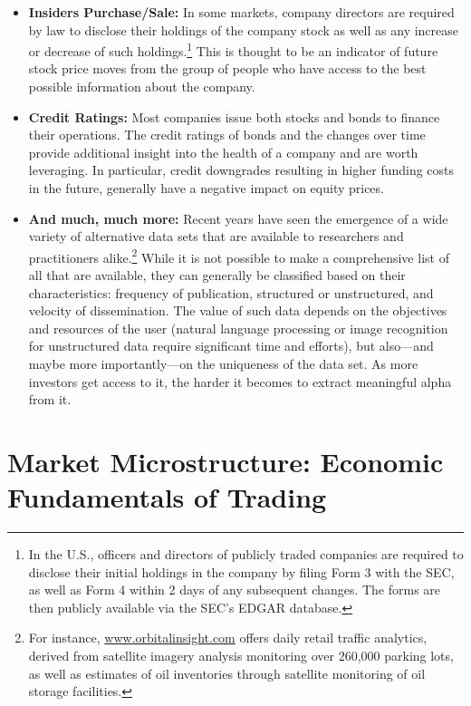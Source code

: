 \begin{itemize}
\item \textbf{Insiders Purchase/Sale:} In some markets, company directors are required by law to disclose their holdings of the company stock as well as any increase or decrease of such holdings.\footnote{In the U.S., officers and directors of publicly traded companies are required to disclose their initial holdings in the company by filing Form 3 with the SEC, as well as Form 4 within 2 days of any subsequent changes. The forms are then publicly available via the SEC's EDGAR database.} This is thought to be an indicator of future stock price moves from the group of people who have access to the best possible information about the company.


\item \textbf{Credit Ratings:} Most companies issue both stocks and bonds to finance their operations. The credit ratings of bonds and the changes over time provide additional insight into the health of a company and are worth leveraging. In particular, credit downgrades resulting in higher funding costs in the future, generally have a negative impact on equity prices.


\item \textbf{And much, much more:} Recent years have seen the emergence of a wide variety of alternative data sets that are available to researchers and practitioners alike.\footnote{For instance, \url{www.orbitalinsight.com} offers daily retail traffic analytics, derived from satellite imagery analysis monitoring over 260,000 parking lots, as well as estimates of oil inventories through satellite monitoring of oil storage facilities.} While it is not possible to make a comprehensive list of all that are available, they can generally be classified based on their characteristics: frequency of publication, structured or unstructured, and velocity of dissemination. The value of such data depends on the objectives and resources of the user (natural language processing or image recognition for unstructured data require significant time and efforts), but also---and maybe more importantly---on the uniqueness of the data set. As more investors get access to it, the harder it becomes to extract meaningful alpha from it. \label{in:data_related2}
\end{itemize}


\section{Market Microstructure: Economic Fundamentals of Trading}\label{in:fund_trade3}\label{in:bidask1}\label{in:micro1}

